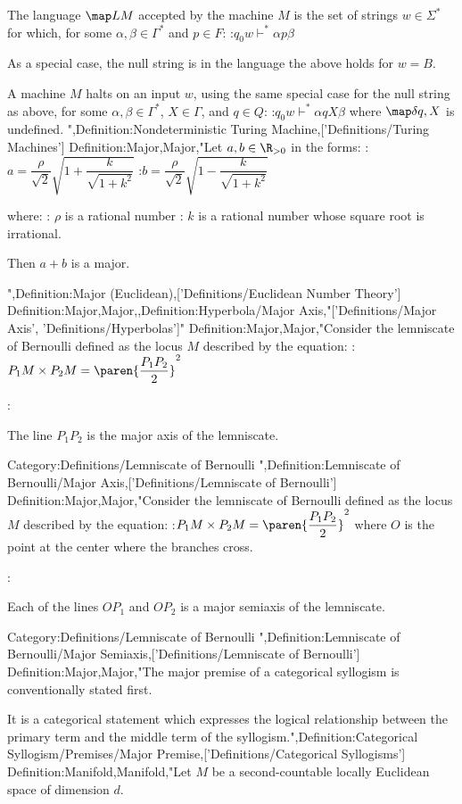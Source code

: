 The language $\map L M$ accepted by the machine $M$ is the set of strings $w \in \Sigma^*$ for which, for some $\alpha, \beta \in \Gamma^*$ and $p \in F$:
:$q_0 w \vdash^* \alpha p \beta$

As a special case, the null string is in the language  the above holds for $w = B$.


A machine $M$ halts on an input $w$, using the same special case for the null string as above,  for some $\alpha, \beta \in \Gamma^*$, $X \in \Gamma$, and $q \in Q$:
:$q_0 w \vdash^* \alpha q X \beta$
where $\map \delta {q, X}$ is undefined.
",Definition:Nondeterministic Turing Machine,['Definitions/Turing Machines']
Definition:Major,Major,"Let $a, b \in \R_{>0}$ in the forms:
:$a = \dfrac \rho {\sqrt 2} \sqrt {1 + \dfrac k {\sqrt {1 + k^2} } }$
:$b = \dfrac \rho {\sqrt 2} \sqrt {1 - \dfrac k {\sqrt {1 + k^2} } }$

where:
: $\rho$ is a rational number
: $k$ is a rational number whose square root is irrational.


Then $a + b$ is a major.


",Definition:Major (Euclidean),['Definitions/Euclidean Number Theory']
Definition:Major,Major,,Definition:Hyperbola/Major Axis,"['Definitions/Major Axis', 'Definitions/Hyperbolas']"
Definition:Major,Major,"Consider the lemniscate of Bernoulli defined as the locus $M$ described by the equation:
:$P_1 M \times P_2 M = \paren {\dfrac {P_1 P_2} 2}^2$


:


The line $P_1 P_2$ is the major axis of the lemniscate.


Category:Definitions/Lemniscate of Bernoulli
",Definition:Lemniscate of Bernoulli/Major Axis,['Definitions/Lemniscate of Bernoulli']
Definition:Major,Major,"Consider the lemniscate of Bernoulli defined as the locus $M$ described by the equation:
:$P_1 M \times P_2 M = \paren {\dfrac {P_1 P_2} 2}^2$
where $O$ is the point at the center where the branches cross.


:


Each of the lines $O P_1$ and $O P_2$ is a major semiaxis of the lemniscate.


Category:Definitions/Lemniscate of Bernoulli
",Definition:Lemniscate of Bernoulli/Major Semiaxis,['Definitions/Lemniscate of Bernoulli']
Definition:Major,Major,"The major premise of a categorical syllogism is conventionally stated first.

It is a categorical statement which expresses the logical relationship between the primary term and the middle term of the syllogism.",Definition:Categorical Syllogism/Premises/Major Premise,['Definitions/Categorical Syllogisms']
Definition:Manifold,Manifold,"Let $M$ be a second-countable locally Euclidean space of dimension $d$. 

